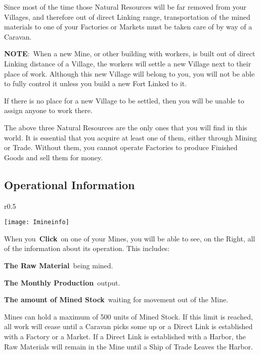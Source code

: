 Since most of the time those Natural Resources will be far removed from your Villages, and therefore out of direct Linking range, transportation of the mined materials to one of your Factories or Markets must be taken care of by way of a Caravan.

\textbf{NOTE}: When a new Mine, or other building with workers, is built out of direct Linking distance of a Village, the workers will settle a new Village next to their place of work. Although this new Village will belong to you, you will not be able to fully control it unless you build a new Fort Linked to it.

If there is no place for a new Village to be settled, then you will be unable to assign anyone to work there.

The above three Natural Resources are the only ones that you will find in this world. It is essential that you acquire at least one of them, either through Mining or Trade. Without them, you cannot operate Factories to produce Finished Goods and sell them for money.

\subsection{Operational Information}

\begin{wrapfigure}{r}{0.5\textwidth}
	\vspace{-20pt}
	\begin{center}
		\texttt{[image: Imineinfo]}
	\end{center}
	\vspace{-20pt}
\end{wrapfigure}

When you \textbf{Click} on one of your Mines, you will be able to see, on the Right, all of the information about its operation. This includes:

\textbf{The Raw Material} being mined.

\textbf{The Monthly Production} output.

\textbf{The amount of Mined Stock} waiting for movement out of the Mine.

Mines can hold a maximum of 500 units of Mined Stock. If this limit is reached, all work will cease until a Caravan picks some up or a Direct Link is established with a Factory or a Market. If a Direct Link is established with a Harbor, the Raw Materials will remain in the Mine until a Ship of Trade Leaves the Harbor.

